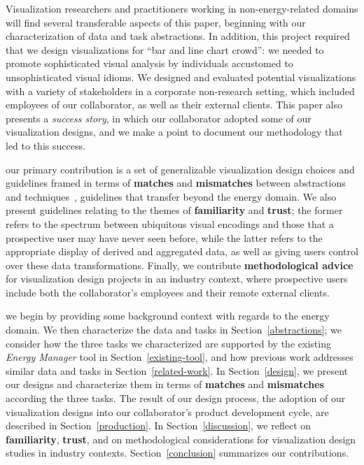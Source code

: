 \documentclass[journal]{vgtc}                %
\newcommand{\bstart}[1]{\vspace{1mm} \noindent{\textbf{#1:}}}
\begin{document}
Visualization researchers and practitioners working in non-energy-related domains will find several transferable aspects of this paper, beginning with our characterization of data and task abstractions.
In addition, this project required that we design visualizations for ``bar and line chart crowd'': we needed to promote sophisticated visual analysis by individuals accustomed to unsophisticated visual idioms.
We designed and evaluated potential visualizations with a variety of stakeholders in a corporate non-research setting, which included employees of our collaborator, as well as their external clients.
This paper also presents a {\it success story}, in which our collaborator adopted some of our visualization designs, and we make a point to document our methodology that led to this success.

\bstart{Contributions} our primary contribution is a set of generalizable visualization design choices and guidelines framed in terms of {\bf matches} and {\bf mismatches} between abstractions and techniques~\cite{Meyer2013}, guidelines that transfer beyond the energy domain.
We also present guidelines relating to the themes of {\bf familiarity} and {\bf trust}; the former refers to the spectrum between ubiquitous visual encodings and those that a prospective user may have never seen before, while the latter refers to the appropriate display of derived and aggregated data, as well as giving users control over these data transformations.
Finally, we contribute {\bf methodological advice} for visualization design projects in an industry context, where prospective users include both the collaborator's employees and their remote external clients.

\bstart{Outline} we begin by providing some background context with regards to the energy domain.
We then characterize the data and tasks in Section~\ref{abstractions}; we consider how the three tasks we characterized are supported by the existing {\it Energy Manager} tool in Section~\ref{existing-tool}, and how previous work addresses similar data and tasks in Section~\ref{related-work}.
In Section~\ref{design}, we present our designs and characterize them in terms of {\bf matches} and {\bf mismatches} according the three tasks.
The result of our design process, the adoption of our visualization designs into our collaborator's product development cycle, are described in Section~\ref{production}.
In Section~\ref{discussion}, we reflect on {\bf familiarity}, {\bf trust}, and on methodological considerations for visualization design studies in industry contexts.
Section~\ref{conclusion} summarizes our contributions.
\end{document}
